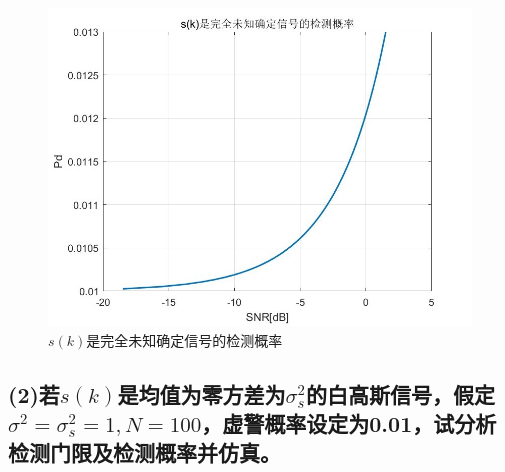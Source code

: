 \documentclass[fontset=windows]{article}
\numberwithin{figure}{section}
\begin{document}
\begin{figure}[H]
    \centering
    \includegraphics[scale=0.5]{fig4.2.jpg}
    \caption{\(s(k)\)是完全未知确定信号的检测概率}
    \label{4.2}
\end{figure}



\subsection*{(2)若\(s(k)\)是均值为零方差为\(\sigma^2_s\)的白高斯信号，假定\(\sigma^2=\sigma^2_s=1,N=100\)，虚警概率设定为0.01，试分析检测门限及检测概率并仿真。}
\end{document}
